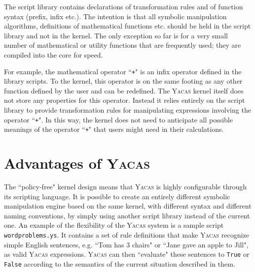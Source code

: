 \documentclass{llncs}
\begin{document}
%
The script library contains declarations of transformation rules and of function
syntax (prefix, infix etc.). The intention is that all symbolic manipulation algorithms, definitions
of mathematical functions etc. should be held in the script library and not in the kernel. The
only exception so far is for a very small number of mathematical or utility
functions that are frequently used; they are compiled into the core for speed.


For example, the mathematical operator ``\texttt{+}" is an infix operator defined in the
library scripts. To the kernel, this operator is on the same footing as any
other function defined by the user and can be redefined. The \textsc{Yacas} kernel
itself does not store any properties for this operator. Instead it relies
entirely on the script library to provide transformation rules for manipulating
expressions involving the operator ``\texttt{+}". In this way, the kernel does not need
to anticipate all possible meanings of the operator ``\texttt{+}" that users might need
in their calculations.

\section{Advantages of \textsc{Yacas}}

The ``policy-free" kernel design means that \textsc{Yacas} is highly configurable
through its scripting language. It is possible to create an entirely different
symbolic manipulation engine based on the same kernel, with different syntax
and different naming  conventions, by simply using another script library
instead of the current one. An example of the flexibility of the
\textsc{Yacas} system is a sample script \texttt{wordproblems.ys}. It contains
a set of rule definitions that make \textsc{Yacas} recognize simple English
sentences, e.g. ``Tom has 3 chairs" or ``Jane gave an apple to Jill", as
valid \textsc{Yacas} expressions. \textsc{Yacas} can then ``evaluate" these
sentences to \texttt{True} or \texttt{False} according to the semantics of the
current situation described in them.
\end{document}
